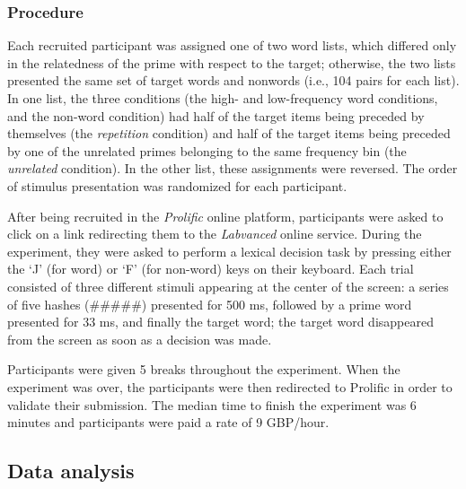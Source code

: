 \documentclass[
]{interact}
\begin{document}
\subsubsection{Procedure}\label{sec-exp1-methods-proc}

Each recruited participant was assigned one of two word lists, which
differed only in the relatedness of the prime with respect to the
target; otherwise, the two lists presented the same set of target words
and nonwords (i.e., 104 pairs for each list). In one list, the three
conditions (the high- and low-frequency word conditions, and the
non-word condition) had half of the target items being preceded by
themselves (the \emph{repetition} condition) and half of the target
items being preceded by one of the unrelated primes belonging to the
same frequency bin (the \emph{unrelated} condition). In the other list,
these assignments were reversed. The order of stimulus presentation was
randomized for each participant.

After being recruited in the \emph{Prolific} online platform,
participants were asked to click on a link redirecting them to the
\emph{Labvanced} online service. During the experiment, they were asked
to perform a lexical decision task by pressing either the `J' (for word)
or `F' (for non-word) keys on their keyboard. Each trial consisted of
three different stimuli appearing at the center of the screen: a series
of five hashes (\#\#\#\#\#) presented for 500 ms, followed by a prime
word presented for 33 ms, and finally the target word; the target word
disappeared from the screen as soon as a decision was made.

Participants were given 5 breaks throughout the experiment. When the
experiment was over, the participants were then redirected to Prolific
in order to validate their submission. The median time to finish the
experiment was 6 minutes and participants were paid a rate of 9
GBP/hour.

\subsection{Data analysis}\label{sec-exp1-analysis}
\end{document}
